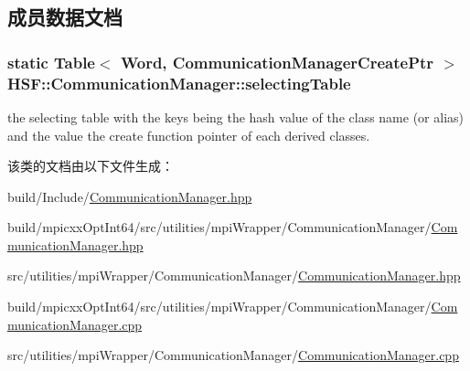 \subsection{成员数据文档}
\hypertarget{classHSF_1_1CommunicationManager_a8134bb28ff180acd3f7b58f00a1ae3fa}{
\subsubsection[{selectingTable}]{\setlength{\rightskip}{0pt plus 5cm}static Table$<$ Word, {\bf CommunicationManagerCreatePtr} $>$ {\bf HSF::CommunicationManager::selectingTable}}}
\label{classHSF_1_1CommunicationManager_a8134bb28ff180acd3f7b58f00a1ae3fa}


the selecting table with the keys being the hash value of the class name (or alias) and the value the create function pointer of each derived classes. 

该类的文档由以下文件生成：\begin{DoxyCompactItemize}
\item 
build/Include/\hyperlink{build_2Include_2CommunicationManager_8hpp}{CommunicationManager.hpp}\item 
build/mpicxxOptInt64/src/utilities/mpiWrapper/CommunicationManager/\hyperlink{build_2mpicxxOptInt64_2src_2utilities_2mpiWrapper_2CommunicationManager_2CommunicationManager_8hpp}{CommunicationManager.hpp}\item 
src/utilities/mpiWrapper/CommunicationManager/\hyperlink{src_2utilities_2mpiWrapper_2CommunicationManager_2CommunicationManager_8hpp}{CommunicationManager.hpp}\item 
build/mpicxxOptInt64/src/utilities/mpiWrapper/CommunicationManager/\hyperlink{build_2mpicxxOptInt64_2src_2utilities_2mpiWrapper_2CommunicationManager_2CommunicationManager_8cpp}{CommunicationManager.cpp}\item 
src/utilities/mpiWrapper/CommunicationManager/\hyperlink{src_2utilities_2mpiWrapper_2CommunicationManager_2CommunicationManager_8cpp}{CommunicationManager.cpp}\end{DoxyCompactItemize}
